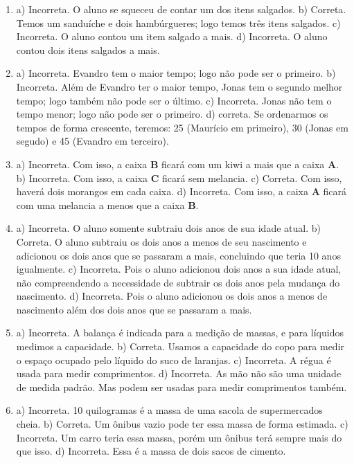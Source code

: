 
\begin{enumerate}
\item
a) Incorreta. O aluno se squeceu de contar um dos itens salgados.
b) Correta. Temos um sanduíche e dois hambúrgueres; logo temos três
itens salgados.
c) Incorreta. O aluno contou um item salgado a mais.
d) Incorreta. O aluno contou dois itens salgados a mais.

\item
a) Incorreta. Evandro tem o maior tempo; logo não pode ser o primeiro.
b) Incorreta. Além de Evandro ter o maior tempo, Jonas tem o segundo
melhor tempo; logo também não pode ser o último.
c) Incorreta. Jonas não tem o tempo menor; logo não pode ser o
primeiro.
d) correta. Se ordenarmos os tempos de forma crescente, teremos: 25 (Maurício em primeiro),
30 (Jonas em segudo) e 45 (Evandro em terceiro).

\item
a) Incorreta. Com isso, a caixa \textbf{B} ficará com um kiwi a mais que a caixa \textbf{A}.
b) Incorreta. Com isso, a caixa \textbf{C} ficará sem melancia.
c) Correta. Com isso, haverá dois morangos em cada caixa.
d) Incorreta. Com isso, a caixa \textbf{A} ficará com uma melancia a menos que a
caixa \textbf{B}.

\item
a) Incorreta. O aluno somente subtraiu dois anos de sua idade atual.
b) Correta. O aluno subtraiu os dois anos a menos de seu nascimento e
adicionou os dois anos que se passaram a mais, concluindo que teria 10
anos igualmente.
c) Incorreta. Pois o aluno adicionou dois anos a sua idade atual, não
compreendendo a necessidade de subtrair os dois anos pela mudança do
nascimento.
d) Incorreta. Pois o aluno adicionou os dois anos a menos de nascimento
além dos dois anos que se passaram a mais.

\item
a) Incorreta. A balança é indicada para a medição de massas, e para
líquidos medimos a capacidade.
b) Correta. Usamos a capacidade do copo para medir o espaço ocupado pelo
líquido do suco de laranjas.
c) Incorreta. A régua é usada para medir comprimentos.
d) Incorreta. As mão não são uma unidade de medida padrão. Mas podem ser
usadas para medir comprimentos também.

\item
a) Incorreta. 10 quilogramas é a massa de uma sacola de supermercados
cheia.
b) Correta. Um ônibus vazio pode ter essa massa de forma estimada.
c) Incorreta. Um carro teria essa massa, porém um ônibus terá sempre
mais do que isso.
d) Incorreta. Essa é a massa de dois sacos de cimento.


\end{enumerate}
